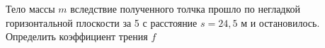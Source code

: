 Тело массы $m$ вследствие полученного толчка прошло по негладкой горизонтальной плоскости за 5 с расстояние $s=24,5$ м 
и остановилось. Определить коэффициент трения $f$
